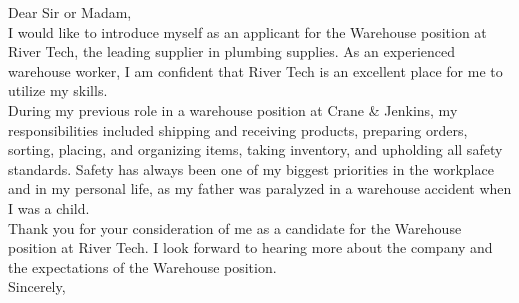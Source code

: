 \subject{Application as Warehouse Assistant at River Tech}
\coverletter[sender=true, vspace=4mm]

Dear Sir or Madam,\\

I would like to introduce myself as an applicant for the Warehouse position at River Tech, the leading supplier in plumbing supplies. As an experienced warehouse worker, I am confident that River Tech is an excellent place for me to utilize my skills. \\

During my previous role in a warehouse position at Crane \& Jenkins, my responsibilities included shipping and receiving products, preparing orders, sorting, placing, and organizing items, taking inventory, and upholding all safety standards. Safety has always been one of my biggest priorities in the workplace and in my personal life, as my father was paralyzed in a warehouse accident when I was a child.\\

Thank you for your consideration of me as a candidate for the Warehouse position at River Tech. I look forward to hearing more about the company and the expectations of the Warehouse position.\\

Sincerely, 
